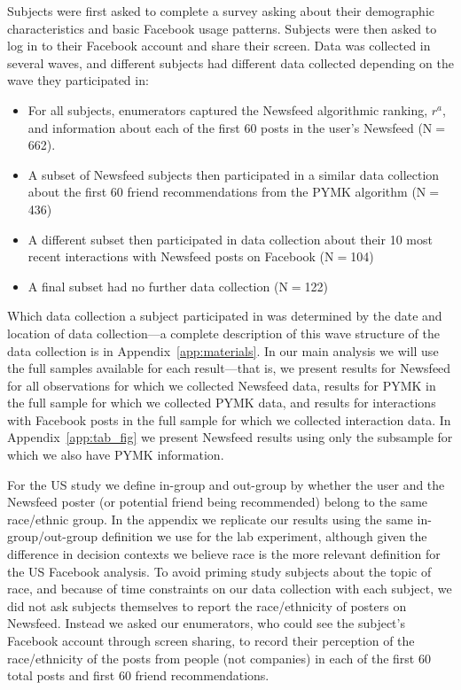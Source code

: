 \documentclass[12pt,letterpaper]{article}
\newcommand{\FullNFUSSurveySampleSize}{662}
\newcommand{\PYMKUSSurveySampleSize}{436}
\newcommand{\RecentInteractionsSampleSize}{104}
\newcommand{\NoFurtherSampleSize}{122}
\begin{document}
Subjects were first asked to complete a survey asking about their demographic characteristics and basic Facebook usage patterns. Subjects were then asked to log in to their Facebook account and share their screen. Data was collected in several waves, and different subjects had different data collected depending on the wave they participated in:
\begin{itemize}
    \item For all subjects, enumerators captured the Newsfeed algorithmic ranking, $r^a$, and information about each of the first 60 posts in the user's Newsfeed (N$=$\FullNFUSSurveySampleSize{}).
    \item A subset of Newsfeed subjects then participated in a similar data collection about the first 60 friend recommendations from the PYMK algorithm (N$=$\PYMKUSSurveySampleSize{})
    \item A different subset then participated in data collection about their 10 most recent interactions with Newsfeed posts on Facebook (N$=$\RecentInteractionsSampleSize{})
    \item A final subset had no further data collection (N$=$\NoFurtherSampleSize{})
\end{itemize}
Which data collection a subject participated in was determined by the date and location of data collection---a complete description of this wave structure of the data collection is in Appendix~\ref{app:materials}. In our main analysis we will use the full samples available for each result---that is, we present results for Newsfeed for all observations for which we collected Newsfeed data, results for PYMK in the full sample for which we collected PYMK data, and results for interactions with Facebook posts in the full sample for which we collected interaction data. In Appendix~\ref{app:tab_fig} we present Newsfeed results using only the subsample for which we also have PYMK information.

For the US study we define in-group and out-group by whether the user and the Newsfeed poster (or potential friend being recommended) belong to the same race/ethnic group. In the appendix we replicate our results using the same in-group/out-group definition we use for the lab experiment, although given the difference in decision contexts we believe race is the more relevant definition for the US Facebook analysis. To avoid priming study subjects about the topic of race, and because of time constraints on our data collection with each subject, we did not ask subjects themselves to report the race/ethnicity of posters on Newsfeed. Instead we asked our enumerators, who could see the subject's Facebook account through screen sharing, to record their perception of the  race/ethnicity of the posts from people (not companies) in each of the first 60 total posts and first 60 friend recommendations.
\end{document}
